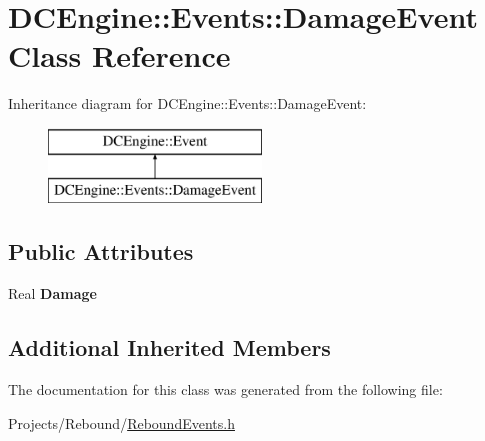 \hypertarget{classDCEngine_1_1Events_1_1DamageEvent}{\section{D\-C\-Engine\-:\-:Events\-:\-:Damage\-Event Class Reference}
\label{classDCEngine_1_1Events_1_1DamageEvent}
}
Inheritance diagram for D\-C\-Engine\-:\-:Events\-:\-:Damage\-Event\-:\begin{figure}[H]
\begin{center}
\leavevmode
\includegraphics[height=2.000000cm]{classDCEngine_1_1Events_1_1DamageEvent}
\end{center}
\end{figure}
\subsection*{Public Attributes}
\begin{DoxyCompactItemize}
\item 
\hypertarget{classDCEngine_1_1Events_1_1DamageEvent_a2c1741c540fa074b7cc7273e83ab7026}{Real {\bfseries Damage}}\label{classDCEngine_1_1Events_1_1DamageEvent_a2c1741c540fa074b7cc7273e83ab7026}

\end{DoxyCompactItemize}
\subsection*{Additional Inherited Members}


The documentation for this class was generated from the following file\-:\begin{DoxyCompactItemize}
\item 
Projects/\-Rebound/\hyperlink{ReboundEvents_8h}{Rebound\-Events.\-h}\end{DoxyCompactItemize}
